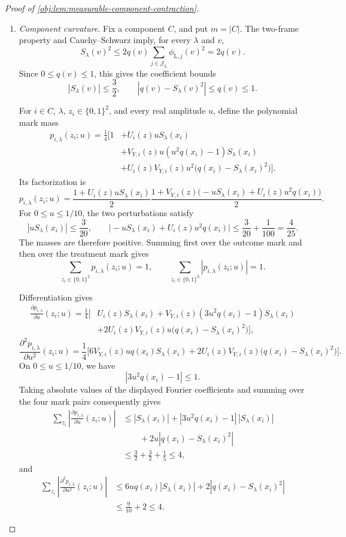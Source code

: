 \begin{proof}[Proof of \cref{obj:lem:measurable-component-contraction}]
\begin{enumerate}
\item \textit{Component curvature.}
Fix a component \(C\), and put \(m=|C|\). The two-frame property and Cauchy--Schwarz imply, for every \(\lambda\) and \(v\),
\[
S_\lambda(v)^2
\le
2q(v)\sum_{j\in\mathcal J_{\mathrm L}}\phi_{\mathrm L,j}(v)^2
=2q(v).
\]
Since \(0\le q(v)\le1\), this gives the coefficient bounds
\[
|S_\lambda(v)|\le\frac32,
\qquad
|q(v)-S_\lambda(v)^2|\le q(v)\le1.
\]

For \(i\in C\), \(\lambda\), \(z_i\in\{0,1\}^2\), and every real amplitude \(u\), define the polynomial mark mass
\[
\begin{aligned}
p_{i,\lambda}(z_i;u)
=\frac14\bigl[
1
&+U_i(z)uS_\lambda(x_i)\\
&+V_{Y,i}(z)u(u^2q(x_i)-1)S_\lambda(x_i)\\
&+U_i(z)V_{Y,i}(z)u^2
   \bigl(q(x_i)-S_\lambda(x_i)^2\bigr)
\bigr].
\end{aligned}
\]
Its factorization is
\[
p_{i,\lambda}(z_i;u)
=
\frac{1+U_i(z)uS_\lambda(x_i)}2
\frac{1+V_{Y,i}(z)
 \bigl(-uS_\lambda(x_i)+U_i(z)u^2q(x_i)\bigr)}2.
\]
For \(0\le u\le1/10\), the two perturbations satisfy
\[
|uS_\lambda(x_i)|\le\frac3{20},
\qquad
\bigl|-uS_\lambda(x_i)+U_i(z)u^2q(x_i)\bigr|
\le\frac3{20}+\frac1{100}
=\frac4{25}.
\]
The masses are therefore positive. Summing first over the outcome mark and then over the treatment mark gives
\[
\sum_{z_i\in\{0,1\}^2}p_{i,\lambda}(z_i;u)=1,
\qquad
\sum_{z_i\in\{0,1\}^2}|p_{i,\lambda}(z_i;u)|=1.
\]

Differentiation gives
\[
\begin{aligned}
\frac{\partial p_{i,\lambda}}{\partial u}(z_i;u)
=\frac14\bigl[
&U_i(z)S_\lambda(x_i)
+V_{Y,i}(z)(3u^2q(x_i)-1)S_\lambda(x_i)\\
&+2U_i(z)V_{Y,i}(z)u
 \bigl(q(x_i)-S_\lambda(x_i)^2\bigr)
\bigr],
\end{aligned}
\]
\[
\frac{\partial^2p_{i,\lambda}}{\partial u^2}(z_i;u)
=\frac14\bigl[
6V_{Y,i}(z)u q(x_i)S_\lambda(x_i)
+2U_i(z)V_{Y,i}(z)
 \bigl(q(x_i)-S_\lambda(x_i)^2\bigr)
\bigr].
\]
On \(0\le u\le1/10\), we have
\[
|3u^2q(x_i)-1|\le1.
\]
Taking absolute values of the displayed Fourier coefficients and summing over the four mark pairs consequently gives
\[
\begin{aligned}
\sum_{z_i}
 \left|\frac{\partial p_{i,\lambda}}{\partial u}(z_i;u)\right|
&\le
|S_\lambda(x_i)|
+|3u^2q(x_i)-1|\,|S_\lambda(x_i)|\\
&\qquad
+2u|q(x_i)-S_\lambda(x_i)^2|\\
&\le \frac32+\frac32+\frac15
\le4,
\end{aligned}
\]
and
\[
\begin{aligned}
\sum_{z_i}
 \left|\frac{\partial^2p_{i,\lambda}}{\partial u^2}(z_i;u)\right|
&\le
6u q(x_i)|S_\lambda(x_i)|
+2|q(x_i)-S_\lambda(x_i)^2|\\
&\le\frac9{10}+2
\le4.
\end{aligned}
\]


\end{enumerate}
\end{proof}
